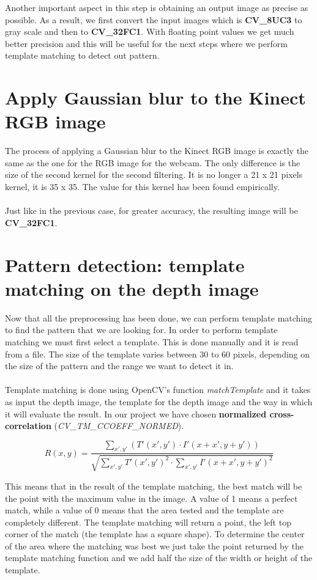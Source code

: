 \noindent
Another important aspect in this step is obtaining an output image as precise as possible. As a result, we first convert the input images which is {\bf CV\_8UC3} to gray scale and then to {\bf CV\_32FC1}. With floating point values we get much better precision and this will be useful for the next steps where we perform template matching to detect out pattern. 

\section{Apply Gaussian blur to the Kinect RGB image}
\noindent
The process of applying a Gaussian blur to the Kinect RGB image is exactly the same as the one for the RGB image for the webcam. The only difference is the size of the second kernel for the second filtering. It is no longer a 21 x 21 pixels kernel, it is 35 x 35. The value for this kernel has been found empirically. 
\\\\
Just like in the previous case, for greater accuracy, the resulting image will be {\bf CV\_32FC1}.

\section{Pattern detection: template matching on the depth image}
\noindent
Now that all the preprocessing has been done, we can perform template matching to find the pattern that we are looking for. In order to perform template matching we must first select a template. This is done manually and it is read from a file. The size of the template varies between 30 to 60 pixels, depending on the size of the pattern and the range we want to detect it in. 
\\\\
Template matching is done using OpenCV's function \emph{matchTemplate} and it takes as input the depth image, the template for the depth image and the way in which it will evaluate the result. In our project we have chosen {\bf normalized cross-correlation} (\emph{CV\_TM\_CCOEFF\_NORMED}). 

$$ R(x,y) = \frac{\sum\limits_{x',y'} (T'(x',y') \cdot I'(x+x', y+y'))}{\sqrt{\sum\limits_{x',y'} T'(x',y')^2 \cdot \sum\limits_{x',y'} I'(x+x', y+y')^2}}$$

\noindent
This means that in the result of the template matching, the best match will be the point with the maximum value in the image. A value of 1 means a perfect match, while a value of 0 means that the area tested and the template are completely different. 
The template matching will return a point, the left top corner of the match (the template has a square shape). To determine the center of the area where the matching was best we just take the point returned by the template matching function and we add half the size of the width or height of the template. 

